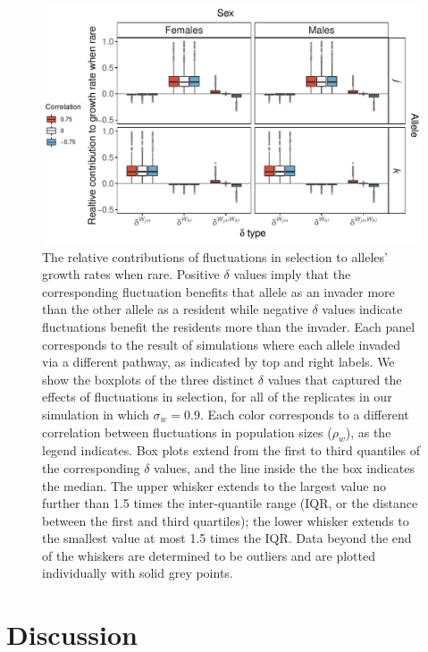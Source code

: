 \begin{refsection}
\begin{figure}[H]
  \centerline{\includegraphics[width=1\textwidth]{figures/chapter4_fig5}}
  \caption[The relative contributions of fluctuations in selection to alleles' growth rates when rare.]{The relative contributions of fluctuations in selection to alleles' growth rates when rare. Positive $\delta$ values imply that the corresponding fluctuation benefits that allele as an invader more than the other allele as a resident while negative $\delta$ values indicate fluctuations benefit the residents more than the invader. Each panel corresponds to the result of simulations where each allele invaded via a different pathway, as indicated by top and right labels. We show the boxplots of the three distinct $\delta$ values that captured the effects of fluctuations in selection, for all of the replicates in our simulation in which $\sigma_{w}=0.9$. Each color corresponds to a different correlation between fluctuations in population sizes ($\rho_{w}$), as the legend indicates. Box plots extend from the first to third quantiles of the corresponding $\delta$ values, and the line inside the the box indicates the median. The upper whisker extends to the largest value no further than 1.5 times the inter-quantile range (IQR, or the distance between the first and third quartiles); the lower whisker extends to the smallest value at most 1.5 times the IQR. Data beyond the end of the whiskers are determined to be outliers and are plotted individually with solid grey points. }
    \label{fig:boxes_selection}
\end{figure}

\section*{Discussion}



\end{refsection}
